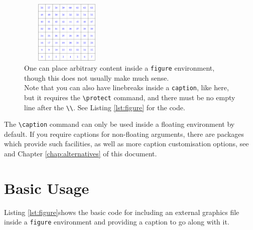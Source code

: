 \documentclass[article,a4paper,oneside,10pt]{memoir}
\newcommand\code[1]{\texttt{#1}}
\begin{document}
\begin{figure}
    \includegraphics[height=3cm,width=4.5cm]{images/grid8cm.png}
    \caption[Linebreaks in Captions]{%
        One can  place arbitrary  content inside a  \code{figure} environment,
        though this does not usually make much sense.\protect\\
        Note  that  you can  also  have  linebreaks inside  a  \code{caption},
        like   here,  but   it  requires   the  \code{\textbackslash{}protect}
        command,   and   there    must   be   no   empty    line   after   the
        \code{\textbackslash\textbackslash}. See Listing  \ref{lst:figure} for
        the code.}
    \label{fig:protect}
\end{figure}

The \verb|\caption| command can only be  used inside a floating environment by
default.   If  you require  captions  for  non-floating arguments,  there  are
packages which provide such facilities,  as well as more caption customisation
options,   see   \cite{ctan:package:caption,ctan:topic:caption}  and   Chapter
\ref{chap:alternatives} of this document.


\chapter{Basic Usage}
\label{chap:basic-usage}

Listing \ref{lst:figure}\footnotemark  shows the  basic code for  including an
external  graphics file  inside a  \verb|figure| environment  and providing  a
caption to go along with it.

\end{document}
